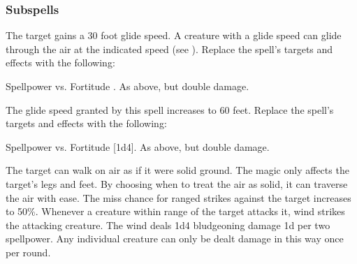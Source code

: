 \subsubsection{Subspells}
The target gains a 30 foot glide speed.
A creature with a glide speed can glide through the air at the indicated speed (see ).
Replace the spell's targets and effects with the following:
\begin{spellcontent}
\begin{augmenttargetinginfo}
\end{augmenttargetinginfo}
\begin{augmenteffects}
\begin{spellattack}{Spellpower vs. Fortitude}
\spellsuccess {}.
\spellcritical As above, but double damage.
\end{spellattack}
\end{augmenteffects}
\end{spellcontent}
The glide speed granted by this spell increases to 60 feet.
Replace the spell's targets and effects with the following:
\begin{spellcontent}
\begin{augmenttargetinginfo}
\end{augmenttargetinginfo}
\begin{augmenteffects}
\begin{spellattack}{Spellpower vs. Fortitude}
\spellsuccess {}[1d4].
\spellcritical As above, but double damage.
\end{spellattack}
\end{augmenteffects}
\end{spellcontent}
The target can walk on air as if it were solid ground.
The magic only affects the target's legs and feet.
By choosing when to treat the air as solid, it can traverse the air with ease.
The miss chance for ranged strikes against the target increases to 50\%.
Whenever a creature within \rngclose range of the target attacks it, wind strikes the attacking creature.
The wind deals 1d4 bludgeoning damage \add 1d per two spellpower.
Any individual creature can only be dealt damage in this way once per round.
